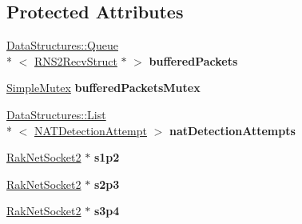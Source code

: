 \subsection*{Protected Attributes}
\begin{DoxyCompactItemize}
\item 
\hypertarget{class_rak_net_1_1_nat_type_detection_server_a66ce57a4d6e4f7e557212fc996342dff}{\hyperlink{class_data_structures_1_1_queue}{Data\-Structures\-::\-Queue}\\*
$<$ \hyperlink{struct_rak_net_1_1_r_n_s2_recv_struct}{R\-N\-S2\-Recv\-Struct} $\ast$ $>$ {\bfseries buffered\-Packets}}\label{class_rak_net_1_1_nat_type_detection_server_a66ce57a4d6e4f7e557212fc996342dff}

\item 
\hypertarget{class_rak_net_1_1_nat_type_detection_server_a13332a428e9b8df2399f63148c770afe}{\hyperlink{class_rak_net_1_1_simple_mutex}{Simple\-Mutex} {\bfseries buffered\-Packets\-Mutex}}\label{class_rak_net_1_1_nat_type_detection_server_a13332a428e9b8df2399f63148c770afe}

\item 
\hypertarget{class_rak_net_1_1_nat_type_detection_server_acdf1c2b2210b185e6ceaebb8786db4df}{\hyperlink{class_data_structures_1_1_list}{Data\-Structures\-::\-List}\\*
$<$ \hyperlink{struct_rak_net_1_1_nat_type_detection_server_1_1_n_a_t_detection_attempt}{N\-A\-T\-Detection\-Attempt} $>$ {\bfseries nat\-Detection\-Attempts}}\label{class_rak_net_1_1_nat_type_detection_server_acdf1c2b2210b185e6ceaebb8786db4df}

\item 
\hypertarget{class_rak_net_1_1_nat_type_detection_server_a9f0415467e2e2b4a3739cb5e1ca22395}{\hyperlink{class_rak_net_1_1_rak_net_socket2}{Rak\-Net\-Socket2} $\ast$ {\bfseries s1p2}}\label{class_rak_net_1_1_nat_type_detection_server_a9f0415467e2e2b4a3739cb5e1ca22395}

\item 
\hypertarget{class_rak_net_1_1_nat_type_detection_server_a8dc02b8f2867a5874d48774d979eaeef}{\hyperlink{class_rak_net_1_1_rak_net_socket2}{Rak\-Net\-Socket2} $\ast$ {\bfseries s2p3}}\label{class_rak_net_1_1_nat_type_detection_server_a8dc02b8f2867a5874d48774d979eaeef}

\item 
\hypertarget{class_rak_net_1_1_nat_type_detection_server_ad824a0bd896b8561254b46d4217bba63}{\hyperlink{class_rak_net_1_1_rak_net_socket2}{Rak\-Net\-Socket2} $\ast$ {\bfseries s3p4}}\label{class_rak_net_1_1_nat_type_detection_server_ad824a0bd896b8561254b46d4217bba63}


\end{DoxyCompactItemize}
